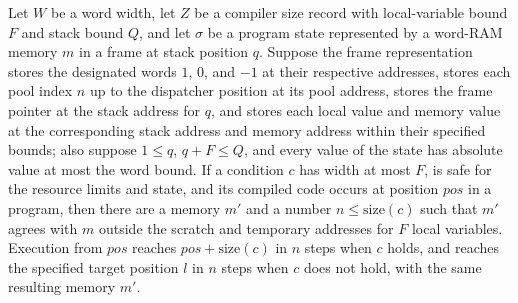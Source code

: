 \begin{theorem}
\label{Light.Compiler.decides_compileCond}
\leanok
{}
Let $W$ be a word width, let $Z$ be a compiler size record with local-variable bound $F$
and stack bound $Q$, and let $\sigma$ be a program state represented by a
word-RAM memory $m$ in a frame at stack position $q$. Suppose the frame representation
stores the designated words $1$, $0$, and $-1$ at their respective addresses, stores
each pool index $n$ up to the dispatcher position at its pool address, stores the frame
pointer at the stack address for $q$, and stores each local value and memory value at
the corresponding stack address and memory address within their specified bounds; also
suppose $1\le q$, $q+F\le Q$, and every value of the state has absolute value at most
the word bound. If a condition $c$ has width at most $F$, is safe for the resource
limits and state, and its compiled code occurs at position $pos$ in a program, then
there are a memory $m'$ and a number $n\le\mathrm{size}(c)$ such that $m'$ agrees with
$m$ outside the scratch and temporary addresses for $F$ local variables. Execution from
$pos$ reaches $pos+\mathrm{size}(c)$ in $n$ steps when $c$ holds, and reaches the
specified target position $l$ in $n$ steps when $c$ does not hold, with the same
resulting memory $m'$.
\end{theorem}
